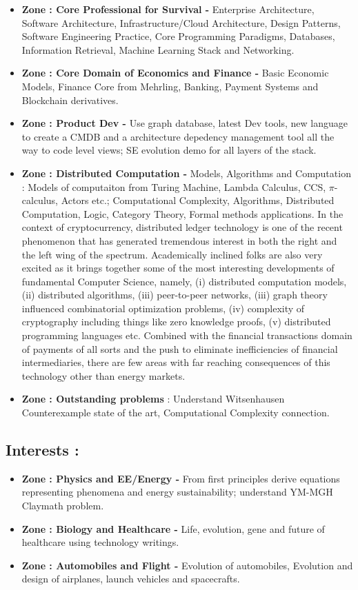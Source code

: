 \documentclass[10pt]{article}
\begin{document}
\begin{itemize}
\item \textbf{Zone : Core Professional for Survival -} Enterprise Architecture,  Software Architecture, Infrastructure/Cloud Architecture, Design Patterns, Software Engineering Practice, Core Programming Paradigms, Databases, Information Retrieval, Machine Learning Stack and Networking.
\item \textbf{Zone : Core Domain of Economics and Finance -} Basic Economic Models, Finance Core from Mehrling, Banking, Payment Systems and Blockchain derivatives.
\item \textbf{Zone : Product Dev - } Use graph database, latest Dev tools, new language to create a CMDB and a architecture depedency management tool all the way to code level views; SE evolution demo for all layers of the stack.
\item \textbf{Zone : Distributed Computation - }  Models, Algorithms and Computation : Models of computaiton from Turing Machine, Lambda Calculus, CCS, $\pi$-calculus, Actors etc.; Computational Complexity, Algorithms, Distributed Computation, Logic, Category Theory, Formal methods applications. In the context of cryptocurrency, distributed ledger technology is one of the recent phenomenon that has generated tremendous interest in both the right and the left wing of the spectrum. Academically inclined folks are also very excited as it brings together some of the most interesting developments of fundamental Computer Science, namely, (i) distributed computation models, (ii) distributed algorithms, (iii) peer-to-peer networks, (iii) graph theory influenced combinatorial optimization problems, (iv) complexity of cryptography including things like zero knowledge proofs, (v) distributed programming languages etc. Combined with the financial transactions domain of payments of all sorts and the push to eliminate inefficiencies of financial intermediaries, there are few areas with far reaching consequences of this technology other than energy markets.
\item \textbf{Zone : Outstanding problems} : Understand Witsenhausen Counterexample state of the art, Computational Complexity connection. 
\end{itemize}
\subsection{Interests : }
\begin{itemize}
\item \textbf{Zone :  Physics and EE/Energy -} From first principles derive equations representing phenomena and energy sustainability; understand YM-MGH Claymath problem.
\item \textbf{Zone : Biology and Healthcare -} Life, evolution, gene and future of healthcare using technology writings.
\item \textbf{Zone : Automobiles and Flight -} Evolution of automobiles, Evolution and design of airplanes, launch vehicles and spacecrafts.
\end{itemize}
\end{document}
